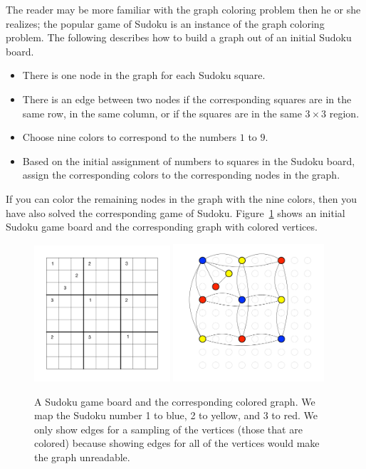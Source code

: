 \documentclass[11pt]{book}
\begin{document}
The reader may be more familiar with the graph coloring problem then he
or she realizes; the popular game of Sudoku is an instance of the
graph coloring problem. The following describes how to build a graph
out of an initial Sudoku board.
\begin{itemize}
\item There is one node in the graph for each Sudoku square.
\item There is an edge between two nodes if the corresponding squares
  are in the same row, in the same column, or if the squares are in
  the same $3\times 3$ region.
\item Choose nine colors to correspond to the numbers $1$ to $9$.
\item Based on the initial assignment of numbers to squares in the
  Sudoku board, assign the corresponding colors to the corresponding
  nodes in the graph.
\end{itemize}
If you can color the remaining nodes in the graph with the nine
colors, then you have also solved the corresponding game of Sudoku.
Figure~\ref{fig:sudoku-graph} shows an initial Sudoku game board and
the corresponding graph with colored vertices.

\begin{figure}[tbp]
\includegraphics[width=0.45\textwidth]{sudoku}
\includegraphics[width=0.5\textwidth]{sudoku-graph}
\caption{A Sudoku game board and the corresponding colored graph.  We
  map the Sudoku number 1 to blue, 2 to yellow, and 3 to red.  We only
  show edges for a sampling of the vertices (those that are colored)
  because showing edges for all of the vertices would make the graph
  unreadable.}
\label{fig:sudoku-graph}
\end{figure}
\end{document}
